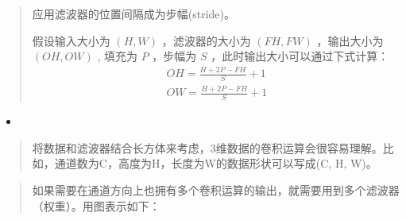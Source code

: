\documentclass[letterpaper,10pt,english]{sphinxmanual}
\begin{document}
\begin{quote}

应用滤波器的位置间隔成为步幅(stride)。


假设输入大小为
\((H,W)\)
，滤波器的大小为
\((FH,FW)\)
，输出大小为
\((OH,OW)\)
, 填充为
\(P\)
，步幅为
\(S\)
，此时输出大小可以通过下式计算：
\begin{equation*}
\begin{split}OH = \frac{H + 2P -FH}{S} + 1\\
OW = \frac{H + 2P -FH}{S} + 1\end{split}
\end{equation*}\end{quote}
\begin{itemize}
\item {} 

\end{itemize}
\begin{quote}


\begin{DUlineblock}{0em}
\item[] 
\end{DUlineblock}

将数据和滤波器结合长方体来考虑，3维数据的卷积运算会很容易理解。比如，通道数为C，高度为H，长度为W的数据形状可以写成(C, H, W)。

\end{quote}

\begin{DUlineblock}{0em}
\item[] 
\end{DUlineblock}
\begin{quote}

如果需要在通道方向上也拥有多个卷积运算的输出，就需要用到多个滤波器（权重）。用图表示如下：

\end{quote}
\end{document}
